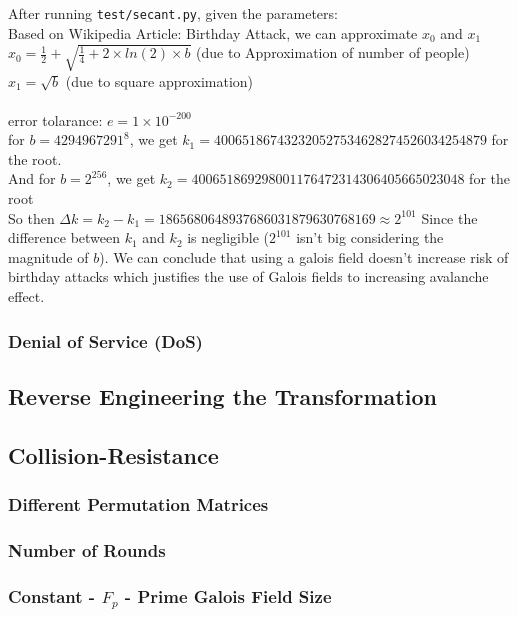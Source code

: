 \documentclass[fleqn, a4paper,12pt]{article}
\begin{document}
After running \texttt{test/secant.py}, given the parameters: \\
Based on Wikipedia Article: Birthday Attack, we can approximate $x_0$ and $x_1$ \\
$x_0 = \frac{1}{2}+\sqrt{\frac{1}{4}+2 \times ln(2) \times b}$ (due to Approximation of number of people) \\
$x_1 = \sqrt{b}$ (due to square approximation) \\
\\ error tolarance:
$e = 1 \times 10^{-200}$ \\
for $b=4294967291^8$,  we get $k_1 = 400651867432320527534628274526034254879$ for the root. \\
And for $b = 2^{256}$, we get $k_2 = 400651869298001176472314306405665023048$ for the root \\
So then $\Delta k = k_2 - k_1 = 1865680648937686031879630768169 \approx 2^{101}$
Since the difference between $k_1$ and $k_2$ is negligible ($2^{101}$ isn't big considering the magnitude of $b$). We can conclude  that using a galois field doesn't increase risk of birthday attacks which justifies the use of Galois fields to increasing avalanche effect.


\subsubsection {Denial of Service (DoS)}

\subsection{Reverse Engineering the Transformation}

\subsection{Collision-Resistance}

\subsubsection{Different Permutation Matrices}

\subsubsection{Number of Rounds}

\subsubsection{Constant - $F_p$ - Prime Galois Field Size} %
\end{document}
